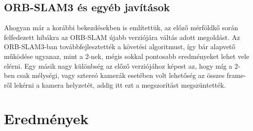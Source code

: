 \subsection{ORB-SLAM3 és egyéb javítások}

Ahogyan már a korábbi bekezdésekben is említettük, az előző mérföldkő során felfedezett hibákra az ORB-SLAM újabb verziójára váltás adott megoldást.
Az ORB-SLAM3-ban továbbfejlesztették a követési algoritmust, így bár alapvető működése ugyanaz, mint a 2-nek, mégis sokkal pontosabb eredményeket lehet vele elérni.
Egy másik nagy különbség az előző verziójához képest az, hogy míg a 2-ben csak mélységi, vagy sztereó kamerák esetében volt lehetőség az összes frame-ről lekérni a kamera helyzetét, addig itt ezt a megszorítást megszüntették.


\section{Eredmények}



